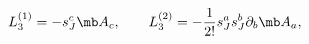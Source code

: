 \begin{equation}
L^{(1)}_{3}=-s^{c}_{J}{\mb A}_{c}, \qquad
L^{(2)}_{3}=-\frac{1}{2!}s^{a}_{J}s^{b}_{J}\partial_{b}{\mb A}_{a},\qquad
\end{equation}

